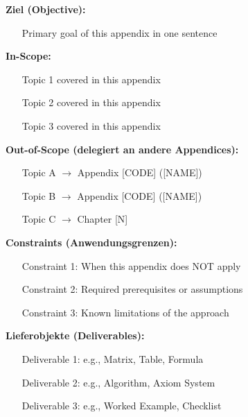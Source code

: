 %
%

\begin{tcolorbox}[
    colback=orange!5!white,
    colframe=orange!75!black,
    title={\textbf{Appendix Scope: Ziel / In-Scope / Out-of-Scope / Constraints}},
    fonttitle=\bfseries
]

\textbf{Ziel (Objective):}
\begin{itemize}[nosep]
    \item [Primary goal of this appendix in one sentence]
\end{itemize}

\textbf{In-Scope:}
\begin{itemize}[nosep]
    \item [Topic 1 covered in this appendix]
    \item [Topic 2 covered in this appendix]
    \item [Topic 3 covered in this appendix]
\end{itemize}

\textbf{Out-of-Scope (delegiert an andere Appendices):}
\begin{itemize}[nosep]
    \item [Topic A] $\rightarrow$ Appendix [CODE] ([NAME])
    \item [Topic B] $\rightarrow$ Appendix [CODE] ([NAME])
    \item [Topic C] $\rightarrow$ Chapter [N]
\end{itemize}

\textbf{Constraints (Anwendungsgrenzen):}
\begin{itemize}[nosep]
    \item [Constraint 1: When this appendix does NOT apply]
    \item [Constraint 2: Required prerequisites or assumptions]
    \item [Constraint 3: Known limitations of the approach]
\end{itemize}

\textbf{Lieferobjekte (Deliverables):}
\begin{itemize}[nosep]
    \item [Deliverable 1: e.g., Matrix, Table, Formula]
    \item [Deliverable 2: e.g., Algorithm, Axiom System]
    \item [Deliverable 3: e.g., Worked Example, Checklist]
\end{itemize}

\end{tcolorbox}


